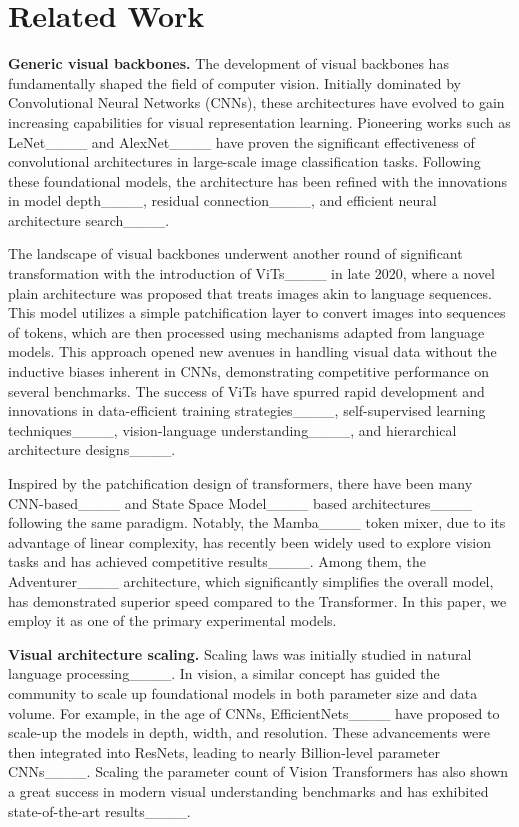 \section{Related Work}
\label{sec:rel}

\textbf{Generic visual backbones.} The development of visual backbones has fundamentally shaped the field of computer vision. Initially dominated by Convolutional Neural Networks (CNNs), these architectures have evolved to gain increasing capabilities for visual representation learning. Pioneering works such as LeNet____ and AlexNet____ have proven the significant effectiveness of convolutional architectures in large-scale image classification tasks. Following these foundational models, the architecture has been refined with the innovations in model depth____, residual connection____, and efficient neural architecture search____.

The landscape of visual backbones underwent another round of significant transformation with the introduction of ViTs____ in late 2020, where a novel plain architecture was proposed that treats images akin to language sequences. This model utilizes a simple patchification layer to convert images into sequences of tokens, which are then processed using mechanisms adapted from language models. This approach opened new avenues in handling visual data without the inductive biases inherent in CNNs, demonstrating competitive performance on several benchmarks. The success of ViTs have spurred rapid development and innovations in data-efficient training strategies____, self-supervised learning techniques____, vision-language understanding____, and hierarchical architecture designs____.

Inspired by the patchification design of transformers, there have been many CNN-based____ and State Space Model____ based architectures____ following the same paradigm. Notably, the Mamba____ token mixer, due to its advantage of linear complexity, has recently been widely used to explore vision tasks and has achieved competitive results____. Among them, the Adventurer____ architecture, which significantly simplifies the overall model, has demonstrated superior speed compared to the Transformer. In this paper, we employ it as one of the primary experimental models.

\textbf{Visual architecture scaling.} Scaling laws was initially studied in natural language processing____. In vision, a similar concept has guided the community to scale up foundational models in both parameter size and data volume. For example, in the age of CNNs, EfficientNets____ have proposed to scale-up the models in depth, width, and  resolution. These advancements were then integrated into ResNets, leading to nearly Billion-level parameter CNNs____. Scaling the parameter count of Vision Transformers has also shown a great success in modern visual understanding benchmarks and has exhibited state-of-the-art results____.